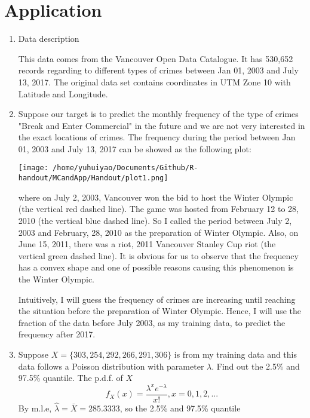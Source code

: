 \section{Application}
\begin{enumerate}
	\item Data description\cite{civ17}
	\par This data comes from the Vancouver Open Data Catalogue. It has 530,652 records regarding to different types of crimes between Jan 01, 2003 and July 13, 2017. The original data set contains coordinates in UTM Zone 10 with Latitude and Longitude. 
	\item Suppose our target is to predict the monthly frequency of the type of crimes "Break and Enter Commercial" in the future and we are not very interested in the exact locations of crimes. The frequency during the period between Jan 01, 2003 and July 13, 2017 can be showed as the following plot:
	\begin{center}
		\texttt{[image: /home/yuhuiyao/Documents/Github/R-handout/MCandApp/Handout/plot1.png]}
	\end{center}
	where on July 2, 2003, Vancouver won the bid to host the Winter Olympic (the vertical red dashed line). The game was hosted from February 12 to 28, 2010 (the vertical blue dashed line). So I called the period between July 2, 2003 and February, 28, 2010 as the preparation of Winter Olympic. Also, on June 15, 2011, there was a riot, 2011 Vancouver Stanley Cup riot (the vertical green dashed line). It is obvious for us to observe that the frequency has a convex shape and one of possible reasons causing this phenomenon is the Winter Olympic. 
	\par Intuitively, I will guess the frequency of crimes are increasing until reaching the situation before the preparation of Winter Olympic. Hence, I will use the fraction of the data before July 2003, as my training data, to predict the frequency after 2017.
	\item
	\par Suppose $X = \{303, 254, 292, 266, 291, 306\}$ is from my training data and this data follows a Poisson distribution with parameter $\lambda$. Find out the 2.5\% and 97.5\% quantile. The p.d.f. of $X$
	\begin{equation*}
		f_X(x) = \frac{\lambda^{x}e^{-\lambda}}{x!} , x = 0, 1, 2, ...
	\end{equation*}
	By m.l.e, $\hat{\lambda} = \bar{X} = 285.3333$, so the 2.5\% and 97.5\% quantile
	\begin{equation*}

\end{equation*}
\end{enumerate}
